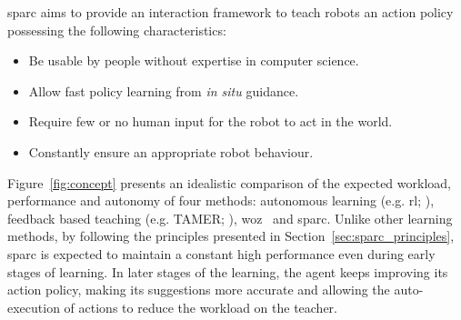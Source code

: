 \gls{sparc} aims to provide an interaction framework to teach robots an action policy possessing the following characteristics:
\begin{itemize}
	\item Be usable by people without expertise in computer science.
	\item Allow fast policy learning from \textit{in situ} guidance.
	\item Require few or no human input for the robot to act in the world.
	\item Constantly ensure an appropriate robot behaviour.
\end{itemize}

Figure~\ref{fig:concept} presents an idealistic comparison of the expected workload, performance and autonomy of four methods: autonomous learning (e.g. \gls{rl}; \citealt{sutton1998reinforcement}), feedback based teaching (e.g. TAMER; \citealt{knox2009interactively}), \gls{woz}~\citep{riek2012wizard} and \gls{sparc}. Unlike other learning methods, by following the principles presented in Section~\ref{sec:sparc_principles}, \gls{sparc} is expected to maintain a constant high performance even during early stages of learning. In later stages of the learning, the agent keeps improving its action policy, making its suggestions more accurate and allowing the auto-execution of actions to reduce the workload on the teacher.

